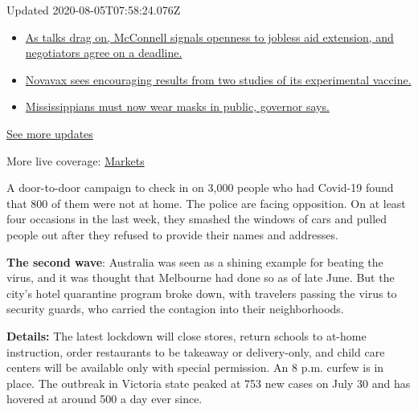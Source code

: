 Updated 2020-08-05T07:58:24.076Z

\begin{itemize}
\tightlist
\item
  \href{https://www.nytimes.com/2020/08/04/world/coronavirus-cases.html?action=click\&pgtype=Article\&state=default\&region=MAIN_CONTENT_1\&context=storylines_live_updates\#link-762df92}{As
  talks drag on, McConnell signals openness to jobless aid extension,
  and negotiators agree on a deadline.}
\item
  \href{https://www.nytimes.com/2020/08/04/world/coronavirus-cases.html?action=click\&pgtype=Article\&state=default\&region=MAIN_CONTENT_1\&context=storylines_live_updates\#link-1228a480}{Novavax
  sees encouraging results from two studies of its experimental
  vaccine.}
\item
  \href{https://www.nytimes.com/2020/08/04/world/coronavirus-cases.html?action=click\&pgtype=Article\&state=default\&region=MAIN_CONTENT_1\&context=storylines_live_updates\#link-794484ed}{Mississippians
  must now wear masks in public, governor says.}
\end{itemize}

\href{https://www.nytimes.com/2020/08/04/world/coronavirus-cases.html?action=click\&pgtype=Article\&state=default\&region=MAIN_CONTENT_1\&context=storylines_live_updates}{See
more updates}

More live coverage:
\href{https://www.nytimes.com/live/2020/08/04/business/stock-market-today-coronavirus?action=click\&pgtype=Article\&state=default\&region=MAIN_CONTENT_1\&context=storylines_live_updates}{Markets}

A door-to-door campaign to check in on 3,000 people who had Covid-19
found that 800 of them were not at home. The police are facing
opposition. On at least four occasions in the last week, they smashed
the windows of cars and pulled people out after they refused to provide
their names and addresses.

\textbf{The second wave}: Australia was seen as a shining example for
beating the virus, and it was thought that Melbourne had done so as of
late June. But the city's hotel quarantine program broke down, with
travelers passing the virus to security guards, who carried the
contagion into their neighborhoods.

\textbf{Details:} The latest lockdown will close stores, return schools
to at-home instruction, order restaurants to be takeaway or
delivery-only, and child care centers will be available only with
special permission. An 8 p.m. curfew is in place. The outbreak in
Victoria state peaked at 753 new cases on July 30 and has hovered at
around 500 a day ever since.


